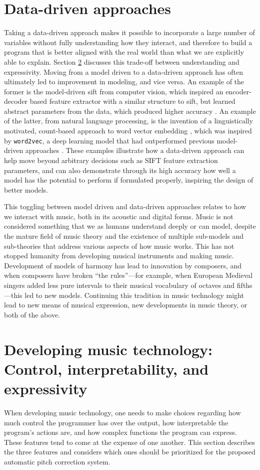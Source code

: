 \section{Data-driven approaches}
\label{sec:pretheory}
Taking a data-driven approach makes it possible to incorporate a large number of variables without fully understanding how they interact, and therefore to build a program that is better aligned with the real world than what we are explicitly able to explain. Section \ref{sec:control-interpret-express} discusses this trade-off between understanding and expressivity. Moving from a model driven to a data-driven approach has often ultimately led to improvement in modeling, and vice versa. An example of the former is the model-driven \gls{sift} from computer vision, which inspired an encoder-decoder based feature extractor with a similar structure to \gls{sift}, but learned abstract parameters from the data, which produced higher accuracy \cite{zheng2017sift}. An example of the latter, from natural language processing, is the invention of a linguistically motivated, count-based approach to word vector embedding \cite{pennington2014glove}, which was inspired by \texttt{word2vec}, a deep learning model that had outperformed previous model-driven approaches \cite{mikolov2013efficient}. These examples illustrate how a data-driven approach can help move beyond arbitrary decisions such as SIFT feature extraction parameters, and can also demonstrate through its high accuracy how well a model has the potential to perform if formulated properly, inspiring the design of better models.

This toggling between model driven and data-driven approaches relates to how we interact with music, both in its acoustic and digital forms. Music is not considered something that we as humans understand deeply or can model, despite the mature field of music theory and the existence of multiple sub-models and sub-theories that address various aspects of how music works. This has not stopped humanity from developing musical instruments and making music. Development of models of harmony has lead to innovation by composers, and when composers have broken ``the rules''---for example, when European Medieval singers added less pure intervals to their musical vocabulary of octaves and fifths---this led to new models. Continuing this tradition in music technology might lead to new means of musical expression, new developments in music theory, or both of the above.

\section{Developing music technology: Control, interpretability, and expressivity}
\label{sec:control-interpret-express}
When developing music technology, one needs to make choices regarding how much control the programmer has over the output, how interpretable the program's actions are, and how complex functions the program can express. These features tend to come at the expense of one another. This section describes the three features and considers which ones should be prioritized for the proposed automatic pitch correction system. 

